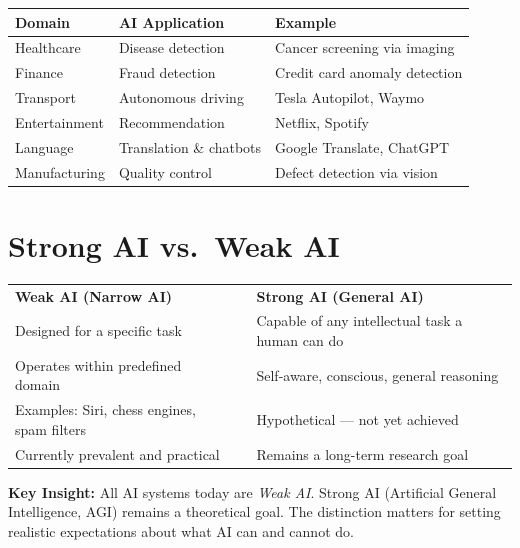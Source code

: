 \documentclass[12pt,a4paper]{report}
\begin{document}
\begin{center}
\begin{tabular}{lll}
\toprule
\textbf{Domain} & \textbf{AI Application} & \textbf{Example} \\
\midrule
Healthcare & Disease detection & Cancer screening via imaging \\
Finance & Fraud detection & Credit card anomaly detection \\
Transport & Autonomous driving & Tesla Autopilot, Waymo \\
Entertainment & Recommendation & Netflix, Spotify \\
Language & Translation \& chatbots & Google Translate, ChatGPT \\
Manufacturing & Quality control & Defect detection via vision \\
\bottomrule
\end{tabular}
\end{center}

\section{Strong AI vs.\ Weak AI}

\begin{tcolorbox}[colback=light, colframe=primary, boxrule=1.5pt, arc=6pt]
\begin{tabular}{p{}p{}p{}}
\textbf{\textcolor{primary}{Weak AI (Narrow AI)}} & & \textbf{\textcolor{danger}{Strong AI (General AI)}} \\[0.2cm]
Designed for a specific task & & Capable of any intellectual task a human can do \\
Operates within predefined domain & & Self-aware, conscious, general reasoning \\
Examples: Siri, chess engines, spam filters & & Hypothetical --- not yet achieved \\
Currently prevalent and practical & & Remains a long-term research goal \\
\end{tabular}
\end{tcolorbox}

\begin{keybox}
\textbf{Key Insight:} All AI systems today are \emph{Weak AI}. Strong AI (Artificial General Intelligence, AGI) remains a theoretical goal. The distinction matters for setting realistic expectations about what AI can and cannot do.
\end{keybox}
\end{document}
